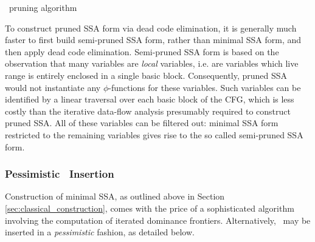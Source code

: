 \begin{algorithm}
\caption{\label{alg:classical_construction_algorithm:pruning}
\phiop\ pruning algorithm
}
\end{algorithm}

To construct pruned SSA form via dead code elimination,
it is generally much faster to first build semi-pruned SSA
form, rather than minimal SSA form, and then apply
dead code elimination.
Semi-pruned SSA form is based on the observation that
many variables are \emph{local} variables, i.e. are variables which live range is entirely enclosed in a single basic block. Consequently, pruned SSA would not 
instantiate any $\phi$-functions for these variables.
Such variables can be identified by a linear traversal
over each basic block of the CFG, which is less costly
than the iterative data-flow analysis presumably required
to construct pruned SSA. 
All of these variables
can be filtered out: minimal SSA form restricted to the remaining variables gives rise to the so called semi-pruned SSA form.




\subsubsection*{Pessimistic \phiop\ Insertion}

Construction of minimal SSA,
as outlined above in Section \ref{sec:classical_construction}, 
comes with the price of a sophisticated algorithm involving 
the computation of iterated dominance frontiers. 
Alternatively, \phiops\ may be inserted in a \textit{pessimistic} fashion,
as detailed below.

